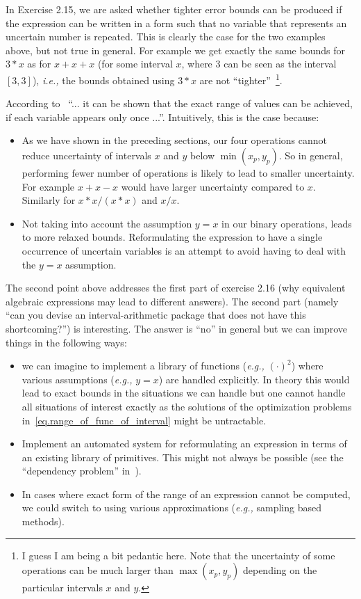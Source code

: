 \documentclass[12pt,a4paper]{article}
\begin{document}
In Exercise 2.15, we are asked whether tighter error bounds can be produced if the
expression can be written in a form such that no variable that represents an uncertain
number is repeated. This is clearly the case for the two examples above, but not true in
general. For example we get exactly the same bounds for $3 * x$ as for $x+x+x$ (for some
interval $x$, where $3$ can be seen as the interval $[3, 3]$), \emph{i.e.,} the bounds
obtained using $3 * x$ are not ``tighter''~\footnote{I guess I am being a bit pedantic
here. Note that the uncertainty of some operations can be much larger than $\max(x_p,
y_p)$ depending on the particular intervals $x$ and $y$.}.

According to~\cite{interval-operators} ``... it can be shown that the exact range of
values can be achieved, if each variable appears only once ...''. Intuitively, this is
the case because:
\begin{itemize}
\item As we have shown in the preceding sections, our four operations cannot reduce
  uncertainty of intervals $x$ and $y$ below $\min(x_p, y_p)$. So in general, performing
  fewer number of operations is likely to lead to smaller uncertainty. For example
  $x+x-x$ would have larger uncertainty compared to $x$. Similarly for $x*x/(x*x)$ and
  $x/x$.
\item Not taking into account the assumption $y=x$ in our binary operations, leads to
  more relaxed bounds. Reformulating the expression to have a single occurrence of
  uncertain variables is an attempt to avoid having to deal with the $y=x$ assumption.
\end{itemize}
The second point above addresses the first part of exercise 2.16 (why equivalent
algebraic expressions may lead to different answers). The second part (namely ``can you
devise an interval-arithmetic package that does not have this shortcoming?'') is
interesting. The answer is ``no'' in general but we can improve things in the following
ways:
\begin{itemize}
\item we can imagine to implement a library of functions (\emph{e.g.,} $(\cdot)^2$)
  where various assumptions (\emph{e.g.,} $y=x$) are handled explicitly. In theory this
  would lead to exact bounds in the situations we can handle but one cannot handle all
  situations of interest exactly as the solutions of the optimization problems
  in~\eqref{eq.range_of_func_of_interval} might be untractable.
\item Implement an automated system for reformulating an expression in terms of an
  existing library of primitives. This might not always be possible (see the
  ``dependency problem'' in~\cite{interval-operators}).
\item In cases where exact form of the range of an expression cannot be computed, we
  could switch to using various approximations (\emph{e.g.,} sampling based methods).
\end{itemize}
\end{document}
